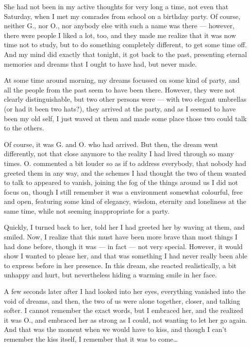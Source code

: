 She had not been in my active thoughts for very long a time, not even that Saturday, when I met my comrades from school on a birthday party. Of course, neither G., nor O., nor anybody else with such a name was there --- however, there were people I liked a lot, too, and they made me realize that it was now time not to study, but to do something completely different, to get some time off. And my mind did exactly that tonight, it got back to the past, presenting eternal memories and dreams that I ought to have had, but never made.

At some time around morning, my dreams focussed on some kind of party, and all the people from the past seem to have been there. However, they were not clearly distinguishable, but two other persons were --- with two elegant umbrellas (or had it been two hats?), they arrived at the party, and as I seemed to have been my old self, I just waved at them and made some place those two could talk to the others.

Of course, it was G. and O. who had arrived. But then, the dream went differently, not that close anymore to the reality I had lived through so many times. O. commented a bit louder so as if to address everybody, that nobody had greeted them in any way, and the schemes I had thought the two of them wanted to talk to appeared to vanish, joining the fog of the things around us I did not focus on, though I still remember it was a environment somewhat colourful, free and open, featuring some kind of elegancy, wisdom, eternity and loneliness at the same time, while not seeming inappropriate for a party.

Quickly, I turned back to her, told her I had greeted her by waving at them, and smiled. Now, I realize that this must have been more brave than most things I had done before, though it was --- in fact --- not very special. However, it would show I wanted to please her, and that was something I had never really been able to express before in her presence. In this dream, she reacted realistically, a bit unhappy and hurt, but nevertheless hiding a warming smile in her face.

A few seconds later after I had looked into her eyes, everything vanished into the void of dreams, and then, the two of us were alone together, closer, and talking softer. I cannot remember the exact words, but I embraced her, and the realized it was O., and embraced her as strong as I could, not wanting to let her go again. And that was the moment when we would have to kiss, and though I can't remember the kiss itself, I remember that it was to come\ldots

